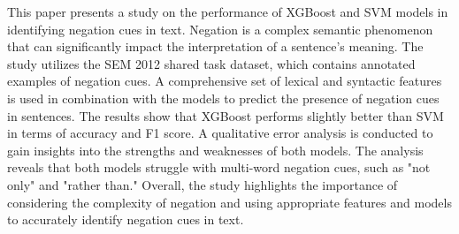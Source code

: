 
This paper presents a study on the performance of XGBoost and SVM models in identifying negation cues in text. Negation is a complex semantic phenomenon that can significantly impact the interpretation of a sentence's meaning. The study utilizes the SEM 2012 shared task dataset, which contains annotated examples of negation cues. A comprehensive set of lexical and syntactic features is used in combination with the models to predict the presence of negation cues in sentences. The results show that XGBoost performs slightly better than SVM in terms of accuracy and F1 score. A qualitative error analysis is conducted to gain insights into the strengths and weaknesses of both models. The analysis reveals that both models struggle with multi-word negation cues, such as "not only" and "rather than." Overall, the study highlights the importance of considering the complexity of negation and using appropriate features and models to accurately identify negation cues in text.


